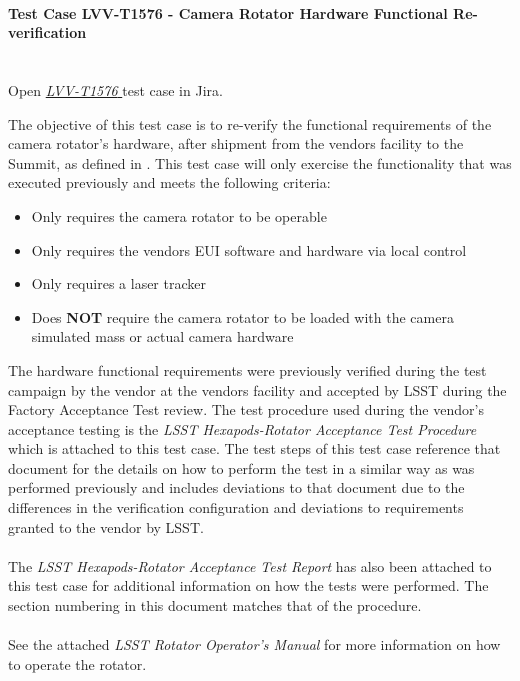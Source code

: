 \documentclass[SE,lsstdraft,STR,toc]{lsstdoc}
\providecommand{\tightlist}{
  \setlength{\itemsep}{0pt}\setlength{\parskip}{0pt}}
\begin{document}
    \paragraph{Test Case LVV-T1576 - Camera Rotator Hardware Functional Re-verification
 }\mbox{}\\

Open  \href{https://jira.lsstcorp.org/secure/Tests.jspa#/testCase/LVV-T1576}{\textit{ LVV-T1576 } }
test case in Jira.

    The objective of this test case is to re-verify the functional
requirements of the camera rotator's hardware, after shipment from the
vendors facility to the Summit, as defined in . This test case
will only exercise the functionality that was executed previously and
meets the following criteria:

\begin{itemize}
\tightlist
\item
  Only requires the camera rotator to be operable
\item
  Only requires the vendors EUI software and hardware via local control
\item
  Only requires a laser tracker
\item
  Does \textbf{NOT} require the camera rotator to be loaded with the
  camera simulated mass or actual camera hardware
\end{itemize}

The hardware functional requirements were previously verified during the
test campaign by the vendor at the vendors facility and accepted by LSST
during the Factory Acceptance Test review. The test procedure used
during the vendor's acceptance testing is the \emph{LSST
Hexapods-Rotator Acceptance Test Procedure} which is attached to this
test case. The test steps of this test case reference that document for
the details on how to perform the test in a similar way as was performed
previously and includes deviations to that document due to the
differences in the verification configuration and deviations to
requirements granted to the vendor by LSST.\\
~\\
The \emph{LSST Hexapods-Rotator Acceptance Test Report} has also been
attached to this test case for additional information on how the tests
were performed. The section numbering in this document matches that of
the procedure.\\
~\\
See the attached \emph{LSST Rotator Operator's Manual} for more
information on how to operate the rotator.
\end{document}
